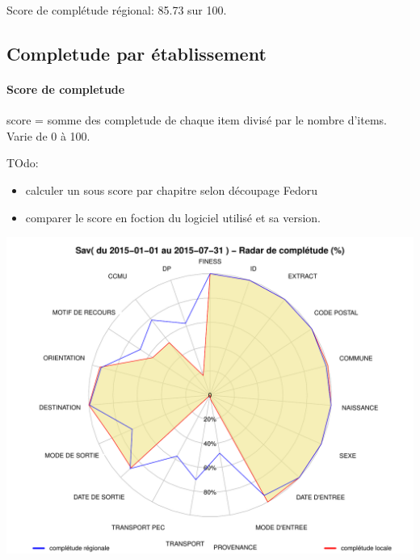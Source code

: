 \documentclass[]{article}
\begin{document}
Score de complétude régional: 85.73 sur 100.

\subsection{Completude par
établissement}\label{completude-par-etablissement}

\paragraph{Score de completude}\label{score-de-completude}

score = somme des completude de chaque item divisé par le nombre
d'items. Varie de 0 à 100.

TOdo:

\begin{itemize}
\itemsep1pt\parskip0pt
\item
  calculer un sous score par chapitre selon découpage Fedoru
\item
  comparer le score en foction du logiciel utilisé et sa version.
\end{itemize}

\includegraphics{completude_files/figure-latex/finess-1.pdf}
\end{document}
